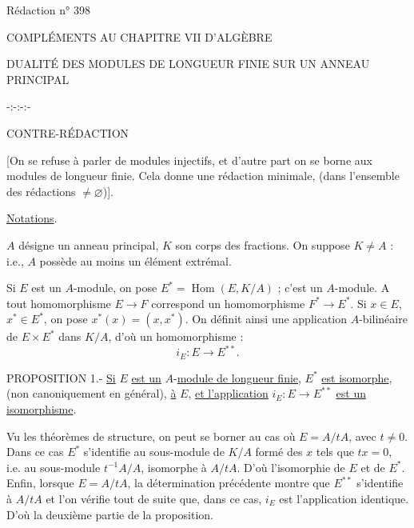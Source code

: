\hfill Rédaction n° 398
\begin{center}
COMPLÉMENTS AU CHAPITRE VII D'ALGÈBRE

DUALITÉ DES MODULES DE LONGUEUR FINIE SUR UN ANNEAU PRINCIPAL

-:-:-:-

CONTRE-RÉDACTION
\end{center}

[On se refuse à parler de modules injectifs, et d'autre part on se borne aux modules de longueur finie. Cela donne une rédaction minimale, (dans l'ensemble des rédactions $\neq\varnothing$)].

\uline{Notations}.

$A$ désigne un anneau principal, $K$ son corps des fractions. On suppose $K\neq A$ : i.e., $A$ possède au moins un élément extrémal.

Si $E$ est un $A$-module, on pose $E^*=\operatorname{Hom}(E,K/A)$ ; c'est un $A$-module. A tout homomorphisme $E\longrightarrow F$ correspond un homomorphisme $F^*\longrightarrow E^*$. Si $x\in E$, $x^*\in E^*$, on pose $x^*(x)=(x,x^*)$. On définit ainsi une application $A$-bilinéaire de $E\times E^*$ dans $K/A$, d'où un homomorphisme :
\[i_E:E\longrightarrow E^{**}.\]

PROPOSITION 1.- \uline{Si} $E$ \uline{est un} $A$-\uline{module de longueur finie}, $E^*$ \uline{est isomorphe}, (non canoniquement en général), \uline{à} $E$, \uline{et l'application} $i_E:E\longrightarrow E^{**}$ \uline{est un isomorphisme}.

Vu les théorèmes de structure, on peut se borner au cas où $E=A/tA$, avec $t\neq0$. Dans ce cas $E^*$ s'identifie au sous-module de $K/A$ formé des $x$ tels que $tx=0$, i.e. au sous-module $t^{-1}A/A$, isomorphe à $A/tA$. D'où l'isomorphie de $E$ et de $E^*$. Enfin, lorsque $E=A/tA$, la détermination précédente montre que $E^{**}$ s'identifie à $A/tA$ et l'on vérifie tout de suite que, dans ce cas, $i_E$ est l'application identique. D'où la deuxième partie de la proposition.

